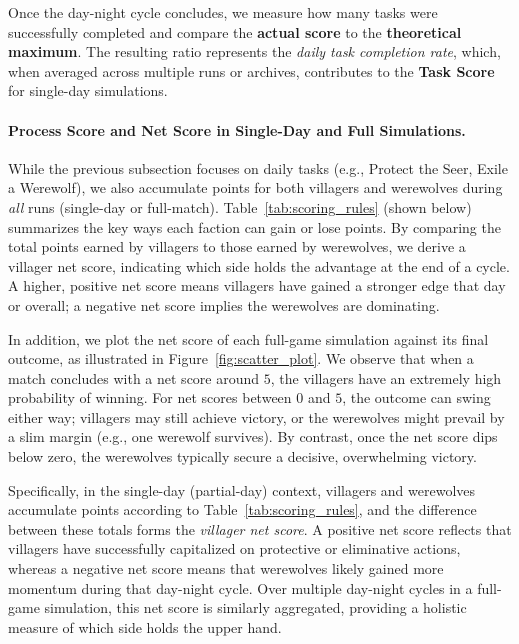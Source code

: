 Once the day-night cycle concludes, we measure how many tasks were successfully completed and compare the \textbf{actual score} to the \textbf{theoretical maximum}. The resulting ratio represents the \emph{daily task completion rate}, which, when averaged across multiple runs or archives, contributes to the \textbf{Task Score} for single-day simulations.

\paragraph{Process Score and Net Score in Single-Day and Full Simulations.}
While the previous subsection focuses on daily tasks (e.g., Protect the Seer, Exile a Werewolf),
we also accumulate points for both villagers and werewolves during \emph{all} runs
(single-day or full-match). Table~\ref{tab:scoring_rules} (shown below) summarizes 
the key ways each faction can gain or lose points. By comparing the total points 
earned by villagers to those earned by werewolves, we derive a villager net score, 
indicating which side holds the advantage at the end of a cycle. A higher, 
positive net score means villagers have gained a stronger edge that day or overall; 
a negative net score implies the werewolves are dominating.

In addition, we plot the net score of each full-game simulation against its final outcome, as illustrated in Figure~\ref{fig:scatter_plot}. We observe that when a match concludes with a net score around $5$, the villagers have an extremely high probability of winning. For net scores between $0$ and $5$, the outcome can swing either way; villagers may still achieve victory, or the werewolves might prevail by a slim margin (e.g., one werewolf survives). By contrast, once the net score dips below zero, the werewolves typically secure a decisive, overwhelming victory.


Specifically, in the single-day (partial-day) context, villagers and werewolves 
accumulate points according to Table~\ref{tab:scoring_rules}, and the difference 
between these totals forms the \emph{villager net score}. A positive net score 
reflects that villagers have successfully capitalized on protective or eliminative 
actions, whereas a negative net score means that werewolves likely gained more 
momentum during that day-night cycle. Over multiple day-night cycles in a 
full-game simulation, this net score is similarly aggregated, providing a 
holistic measure of which side holds the upper hand.

